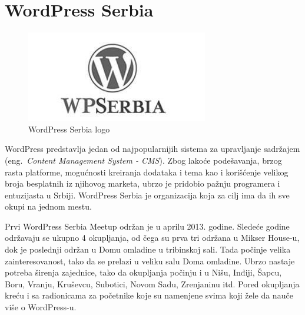 \documentclass[a4paper]{article}
\begin{document}
{

\section{WordPress Serbia}
\begin{figure}[h!]
\begin{center}
\includegraphics[scale=0.5]{wp.jpg}
\end{center}
\caption{WordPress Serbia logo}
\label{fig:pande}
\end{figure}
WordPress predstavlja jedan od najpopularnijih sistema za upravljanje sadržajem (eng.~{\em Content Management System - CMS}). Zbog lakoće podešavanja, brzog rasta platforme, mogućnosti kreiranja dodataka i tema kao i korišćenje velikog broja besplatnih iz njihovog marketa, ubrzo je pridobio pažnju programera i entuzijasta u Srbiji. WordPress Serbia je organizacija koja za cilj ima da ih sve okupi na jednom mestu. 

Prvi WordPress Serbia Meetup održan je u aprilu 2013. godine. Sledeće godine održavaju se ukupno 4 okupljanja, od čega su prva tri održana u Mikser House-u, dok je poslednji održan u Domu omladine u tribinskoj sali. Tada počinje velika zainteresovanost, tako da se prelazi u veliku salu Doma omladine. Ubrzo nastaje potreba širenja zajednice, tako da okupljanja počinju i u Nišu, Inđiji, Šapcu, Boru, Vranju, Kruševcu, Subotici, Novom Sadu, Zrenjaninu itd. Pored okupljanja kreću i sa radionicama za početnike koje su namenjene svima koji žele da nauče više o WordPress-u.

}
\end{document}
